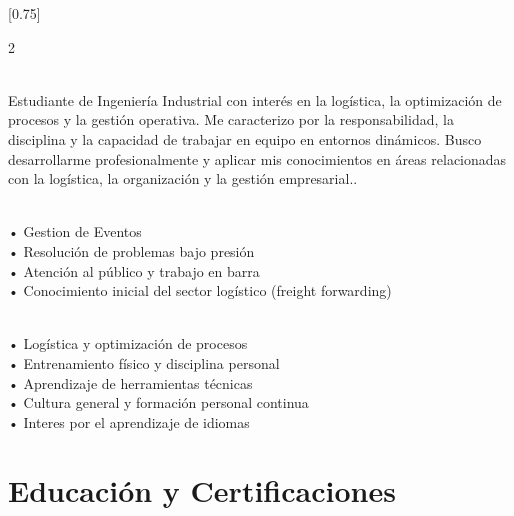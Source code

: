 \documentclass[lighthipster]{simplehipstercv}
\begin{document}
\setlength{\columnsep}{1.5cm}
[0.75]
\begin{paracol}{2}

\paracolbackgroundoptions

\footnotesize
{\setasidefontcolour
\flushright
\begin{center}
\end{center}



\bigskip

\\[0.5em]
Estudiante de Ingeniería Industrial con interés en la logística, la optimización de procesos y la gestión operativa. Me caracterizo por la responsabilidad, la disciplina y la capacidad de trabajar en equipo en entornos dinámicos. Busco desarrollarme profesionalmente y aplicar mis conocimientos en áreas relacionadas con la logística, la organización y la gestión empresarial..

\bigskip

 \\[0.5em]
• Gestion de Eventos \\
• Resolución de problemas bajo presión \\
• Atención al público y trabajo en barra\\
• Conocimiento inicial del sector logístico (freight forwarding)

\bigskip

\\[0.5em]
• Logística y optimización de procesos \\
• Entrenamiento físico y disciplina personal \\
• Aprendizaje de herramientas técnicas \\
• Cultura general y formación personal continua \\
• Interes por el aprendizaje de idiomas

\vspace{4em}



\phantom{turn the page}
\phantom{turn the page}
}
\switchcolumn

\small
\section*{Educación y Certificaciones}


\end{paracol}
\end{document}

